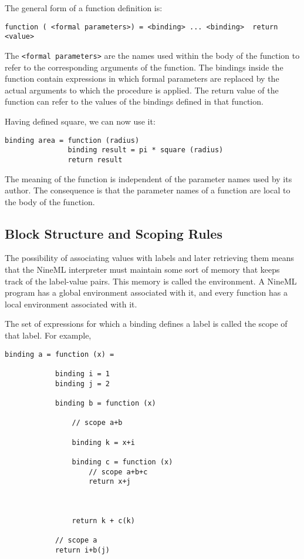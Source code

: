 \documentclass[10pt]{article}
\begin{document}
The general form of a function definition is: \begin{center}
{\small{}\begin{verbatim}
function ( <formal parameters>) = <binding> ... <binding>  return <value>
\end{verbatim}
}\end{center}


The \texttt{<formal parameters>} are the names used within the
body of the function to refer to the corresponding arguments of the
function. The bindings inside the function contain expressions in
which formal parameters are replaced by the actual arguments to which
the procedure is applied. The return value of the function can refer
to the values of the bindings defined in that function. 

Having defined square, we can now use it: \begin{center}
{\small{}\begin{verbatim}
binding area = function (radius)
               binding result = pi * square (radius)
               return result
\end{verbatim}
}\end{center}


The meaning of the function is independent of the parameter names
used by its author. The consequence is that the parameter names of a
function are local to the body of the function. 

\subsection*{Block Structure and Scoping Rules}
The possibility of associating values with labels and later
retrieving them means that the NineML interpreter must maintain some
sort of memory that keeps track of the label-value pairs. This memory
is called the environment. A NineML program has a global environment
associated with it, and every function has a local environment
associated with it. 

The set of expressions for which a binding defines a label is called
the scope of that label.  For example, \begin{center}
{\small{}\begin{verbatim}
binding a = function (x) =

            binding i = 1
            binding j = 2

            binding b = function (x)

                // scope a+b

                binding k = x+i

                binding c = function (x)
                    // scope a+b+c
                    return x+j

 

                return k + c(k)

            // scope a
            return i+b(j)
\end{verbatim}
}\end{center}
\end{document}
